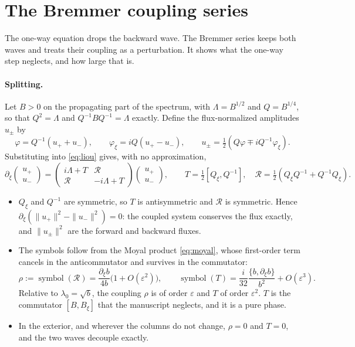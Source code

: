 \documentclass[11pt]{article}
\newcommand{\pd}{\partial}
\begin{document}
\section{The Bremmer coupling series}\label{sec:bremmer}

The one-way equation drops the backward wave. The Bremmer series
\cite{bremmer,atkinson,dehoop} keeps both waves and treats their coupling as a
perturbation. It shows what the one-way step neglects, and how large that is.

\paragraph{Splitting.} Let $B>0$ on the propagating part of the spectrum, with
$\Lambda=B^{1/2}$ and $Q=B^{1/4}$, so that $Q^2=\Lambda$ and $Q^{-1}BQ^{-1}=\Lambda$
exactly. Define the flux-normalized amplitudes $u_\pm$ by
\begin{equation}\label{eq:split}
\varphi=Q^{-1}(u_++u_-),\qquad \varphi_\xi=iQ(u_+-u_-),\qquad
u_\pm=\tfrac12\left(Q\varphi\mp iQ^{-1}\varphi_\xi\right).
\end{equation}
Substituting into \eqref{eq:liou} gives, with no approximation,
\begin{equation}\label{eq:coupled}
\pd_\xi\begin{pmatrix}u_+\\u_-\end{pmatrix}
=\begin{pmatrix}i\Lambda+T & \mathcal R\\ \mathcal R & -i\Lambda+T\end{pmatrix}
\begin{pmatrix}u_+\\u_-\end{pmatrix},\qquad
T=\tfrac12\left[Q_\xi,Q^{-1}\right],\quad
\mathcal R=\tfrac12\left(Q_\xi Q^{-1}+Q^{-1}Q_\xi\right).
\end{equation}
\begin{itemize}
\item $Q_\xi$ and $Q^{-1}$ are symmetric, so $T$ is antisymmetric and $\mathcal R$
  is symmetric. Hence
  $\pd_\xi\left(\|u_+\|^2-\|u_-\|^2\right)=0$: the coupled system conserves the
  flux exactly, and $\|u_\pm\|^2$ are the forward and backward fluxes.
\item The symbols follow from the Moyal product \eqref{eq:moyal}, whose
  first-order term cancels in the anticommutator and survives in the
  commutator:
  \begin{equation}\label{eq:RT}
  \rho:=\operatorname{symbol}(\mathcal R)=\frac{\pd_\xi b}{4b}\bigl(1+O(\varepsilon^2)\bigr),\qquad
  \operatorname{symbol}(T)=\frac i{32}\frac{\{b,\pd_\xi b\}}{b^2}+O(\varepsilon^3).
  \end{equation}
  Relative to $\lambda_0=\sqrt b$, the coupling $\rho$ is of order
  $\varepsilon$ and $T$ of order $\varepsilon^2$. $T$ is the commutator
  $[B,B_\xi]$ that the manuscript neglects, and it is a pure phase.
\item In the exterior, and wherever the columns do not change, $\rho=0$ and
  $T=0$, and the two waves decouple exactly.
\end{itemize}
\end{document}
